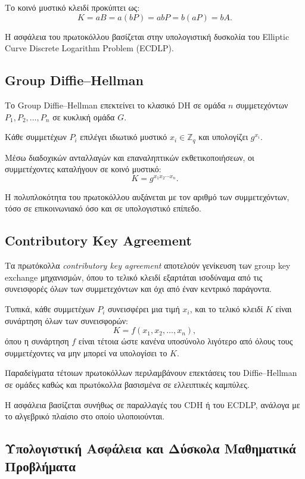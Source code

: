 \documentclass[12pt,a4paper]{report}
\begin{document}
Το κοινό μυστικό κλειδί προκύπτει ως:
\[
K = aB = a(bP) = abP = b(aP) = bA.
\]

Η ασφάλεια του πρωτοκόλλου βασίζεται στην υπολογιστική δυσκολία του Elliptic Curve Discrete Logarithm Problem (ECDLP).

\subsection{Group Diffie--Hellman}

Το Group Diffie--Hellman επεκτείνει το κλασικό DH σε ομάδα $n$ συμμετεχόντων $P_1, P_2, \dots, P_n$ σε κυκλική ομάδα $G$.

Κάθε συμμετέχων $P_i$ επιλέγει ιδιωτικό μυστικό $x_i \in \mathbb{Z}_q$ και υπολογίζει $g^{x_i}$.

Μέσω διαδοχικών ανταλλαγών και επαναληπτικών εκθετικοποιήσεων, οι συμμετέχοντες καταλήγουν σε κοινό μυστικό:
\[
K = g^{x_1 x_2 \cdots x_n}.
\]

Η πολυπλοκότητα του πρωτοκόλλου αυξάνεται με τον αριθμό των συμμετεχόντων, τόσο σε επικοινωνιακό όσο και σε υπολογιστικό επίπεδο.

\subsection{Contributory Key Agreement}

Τα πρωτόκολλα \textit{contributory key agreement} αποτελούν γενίκευση των group key exchange μηχανισμών, όπου το τελικό κλειδί εξαρτάται ισοδύναμα από τις συνεισφορές όλων των συμμετεχόντων και όχι από έναν κεντρικό παράγοντα.

Τυπικά, κάθε συμμετέχων $P_i$ συνεισφέρει μια τιμή $x_i$, και το τελικό κλειδί $K$ είναι συνάρτηση όλων των συνεισφορών:
\[
K = f(x_1, x_2, \dots, x_n),
\]
όπου η συνάρτηση $f$ είναι τέτοια ώστε κανένα υποσύνολο λιγότερο από όλους τους συμμετέχοντες να μην μπορεί να υπολογίσει το $K$.

Παραδείγματα τέτοιων πρωτοκόλλων περιλαμβάνουν επεκτάσεις του Diffie--Hellman σε ομάδες καθώς και πρωτόκολλα βασισμένα σε ελλειπτικές καμπύλες.

Η ασφάλεια βασίζεται συνήθως σε παραλλαγές του CDH ή του ECDLP, ανάλογα με το αλγεβρικό πλαίσιο στο οποίο υλοποιούνται.

\subsection{Υπολογιστική Ασφάλεια και Δύσκολα Μαθηματικά Προβλήματα}
\end{document}
